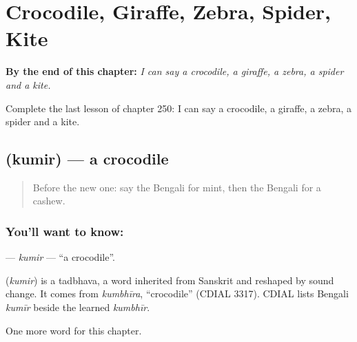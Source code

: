 
\chapter{Crocodile, Giraffe, Zebra, Spider, Kite}
\label{ch:bn-crocodile-giraffe-zebra-spider-kite}

\begin{chapteropening}
\textbf{By the end of this chapter:} \emph{I can say a crocodile, a giraffe, a zebra, a spider and a kite.}

Complete the last lesson of chapter 250: I can say a crocodile, a giraffe, a zebra, a spider and a kite.
\end{chapteropening}

\section[\texorpdfstring{\bn{কুমির} (kumir)}{কুমির (kumir)}]{ (kumir) — a crocodile}

\label{lesson:BN-C250-kumir}



\begin{quote}
Before the new one: say the Bengali for mint, then the Bengali for a cashew.
\end{quote}

\subsection*{You'll want to know: }
\textbf{} — \emph{kumir} — \textquotedblleft{}a crocodile\textquotedblright{}.

\begin{cousinweb}
\textbf{} (\emph{kumir}) is a tadbhava, a word inherited from Sanskrit and reshaped by sound change. It comes from \emph{kumbhīra}, \textquotedblleft{}crocodile\textquotedblright{} (CDIAL 3317). CDIAL lists Bengali \emph{kumīr} beside the learned \emph{kumbhīr}.
\end{cousinweb}

\begin{grammarlens}[title={What you've built}]
One more word for this chapter.
\end{grammarlens}

